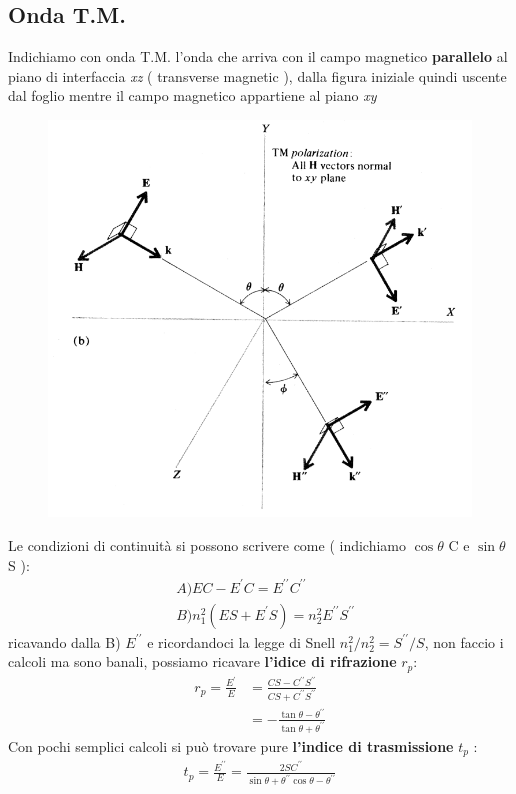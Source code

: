 \subsection{Onda T.M.}
Indichiamo con onda T.M. l'onda che arriva con il campo magnetico \textbf{parallelo} al piano 
di interfaccia \textit{xz} ( transverse magnetic ), dalla figura iniziale quindi uscente dal foglio
mentre il campo magnetico appartiene al piano \textit{xy}
\begin{figure}[!h]
    \centering
    \includegraphics[scale=0.3]{riflessione/OndaTM}
\end{figure}

Le condizioni di continuità si possono scrivere come ( indichiamo $\cos{\theta}$ C e $\sin{\theta}$ S ):
\begin{align*}
    &A) EC - E^{\prime}C = E^{\prime\prime}C^{\prime\prime}\\
    &B) n^2_{1}(ES + E^{\prime}S) = n^2_{2}E^{\prime\prime}S^{\prime\prime}
\end{align*}
ricavando dalla B) $E^{\prime\prime}$ e ricordandoci la legge di Snell $n^2_{1}/n^2_{2}=S^{\prime\prime}/S$, non faccio i calcoli ma sono banali, 
possiamo ricavare \textbf{l'idice di rifrazione} $r_{p}$:
\begin{align*}
        r_{p} = \frac{E^{\prime}}{E} &= \frac{CS-C^{\prime\prime}S^{\prime\prime}}{CS+C^{\prime\prime}S^{\prime\prime}}\\[1em]
                                     &= -\frac{\tan{\theta-\theta^{\prime\prime}}}{\tan{\theta+\theta^{\prime\prime}}}
\end{align*}
Con pochi semplici calcoli si può trovare pure \textbf{l'indice di trasmissione} $t_{p}$ : 
\begin{align*}
    t_{p} = \frac{E^{\prime\prime}}{E} = \frac{2SC^{\prime\prime}}{\sin{\theta+\theta^{\prime\prime}}\cos{\theta-\theta^{\prime\prime}}}
\end{align*}
\newpage
